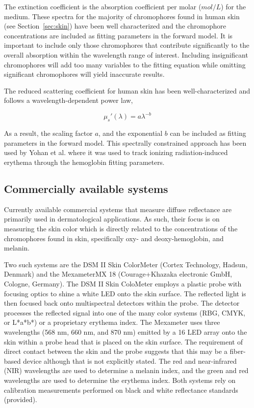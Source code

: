 The extinction coefficient is the absorption coefficient per molar ($mol/L$) for the medium. These spectra for the majority of chromophores found in human skin (see Section~\ref{sec:skin}) have been well characterized and the chromophore concentrations are included as fitting parameters in the forward model. It is important to include only those chromophores that contribute significantly to the overall absorption within the wavelength range of interest.\cite{Kim2011} Including insignificant chromophores will add too many variables to the fitting equation while omitting significant chromophores will yield inaccurate results.

The reduced scattering coefficient for human skin has been well-characterized and follows a wavelength-dependent power law,\cite{Doornbos1999}

\begin{equation}
\mu_s'(\lambda) = a\lambda^{-b}
\end{equation}

As a result, the scaling factor $a$, and the exponential $b$ can be included as fitting parameters in the forward model. This spectrally constrained approach has been used by Yohan et al.\cite{Yohan2014} where it was used to track ionizing radiation-induced erythema through the hemoglobin fitting parameters.

\subsection{Commercially available systems}
Currently available commercial systems that measure diffuse reflectance are primarily used in dermatological applications. As such, their focus is on measuring the skin color which is directly related to the concentrations of the chromophores found in skin, specifically oxy- and deoxy-hemoglobin, and melanin.

Two such systems are the DSM II Skin ColorMeter (Cortex Technology, Hadsun, Denmark) and the Mexameter\textregistered MX 18 (Courage+Khazaka electronic GmbH, Cologne, Germany). The DSM II Skin ColoMeter employs a plastic probe with focusing optics to shine a white LED onto the skin surface. The reflected light is then focused back onto multispectral detectors within the probe. The detector processes the reflected signal into one of the many color systems (RBG, CMYK, or L*a*b*) or a proprietary erythema index. The Mexameter uses three wavelengths (568 nm, 660 nm, and 870 nm) emitted by a 16 LED array onto the skin within a probe head that is placed on the skin surface. The requirement of direct contact between the skin and the probe suggests that this may be a fiber-based device although that is not explicitly stated. The red and near-infrared (NIR) wavelengths are used to determine a melanin index, and the green and red wavelengths are used to determine the erythema index.\cite{Clarys2000} Both systems rely on calibration measurements performed on black and white reflectance standards (provided).


